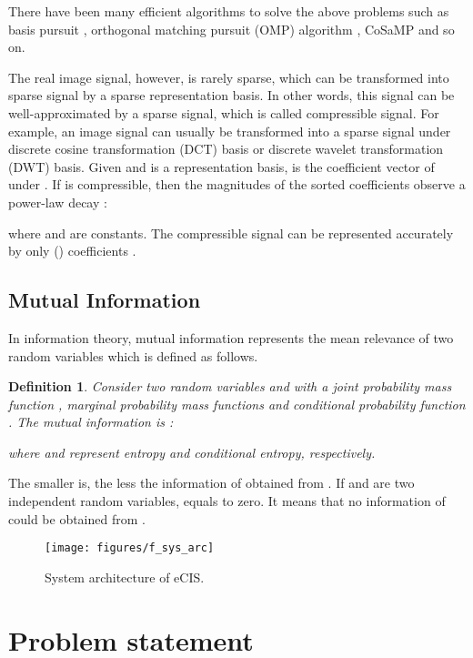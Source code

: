 \documentclass[conference]{IEEEtran}
\newtheorem{definition}{Definition}
\begin{document}
There have been many efficient algorithms to solve the above problems such as basis pursuit \cite{candes2005decoding}, orthogonal matching pursuit (OMP) algorithm \cite{OMP}, CoSaMP \cite{needell2009cosamp} and so on.

The real image signal, however, is rarely  sparse, which can be transformed into sparse signal by a sparse representation basis.  In other words, this signal can be well-approximated by a sparse signal, which is called compressible signal. For example, an image signal  can usually be transformed into a sparse signal  under  discrete cosine transformation (DCT) basis or discrete wavelet transformation (DWT) basis. Given  and  is a  representation basis,  is the coefficient vector of  under . If  is compressible, then the magnitudes of the sorted coefficients  observe a power-law decay :
 
where  and  are constants. The compressible signal  can be represented accurately by only  () coefficients \cite{compsig1998}.

\subsection{Mutual Information}
In information theory, mutual information represents the mean relevance of two random variables which is defined as follows.
\begin{definition} \label{def_mu} \cite{elementIt2006}
Consider two random variables  and  with a joint probability mass function , marginal probability mass functions  and conditional probability function . The mutual information  is :

where  and  represent entropy and conditional entropy, respectively.
\end{definition}

The smaller  is, the less the information of  obtained from . If  and  are two  independent random variables,  equals to zero. It means that no information of  could be obtained from .

\begin{figure}
\begin{center}
  \texttt{[image: figures/f\_sys\_arc]}\\
  \caption{System architecture of  eCIS.}\label{f_arc}
\end{center}
\end{figure}

\section{Problem statement}
\end{document}

